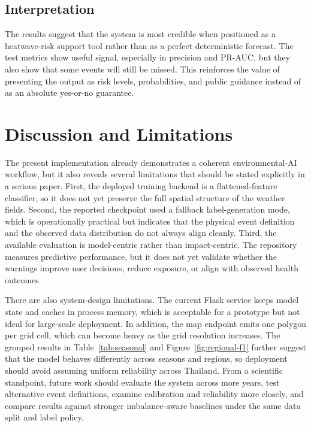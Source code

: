 \documentclass[12pt,a4paper]{article}
\begin{document}
\subsection{Interpretation}
The results suggest that the system is most credible when positioned as a heatwave-risk support tool rather than as a perfect deterministic forecast. The test metrics show useful signal, especially in precision and PR-AUC, but they also show that some events will still be missed. This reinforces the value of presenting the output as risk levels, probabilities, and public guidance instead of as an absolute yes-or-no guarantee.

\section{Discussion and Limitations}
The present implementation already demonstrates a coherent environmental-AI workflow, but it also reveals several limitations that should be stated explicitly in a serious paper. First, the deployed training backend is a flattened-feature classifier, so it does not yet preserve the full spatial structure of the weather fields. Second, the reported checkpoint used a fallback label-generation mode, which is operationally practical but indicates that the physical event definition and the observed data distribution do not always align cleanly. Third, the available evaluation is model-centric rather than impact-centric. The repository measures predictive performance, but it does not yet validate whether the warnings improve user decisions, reduce exposure, or align with observed health outcomes.

There are also system-design limitations. The current Flask service keeps model state and caches in process memory, which is acceptable for a prototype but not ideal for large-scale deployment. In addition, the map endpoint emits one polygon per grid cell, which can become heavy as the grid resolution increases. The grouped results in Table~\ref{tab:seasonal} and Figure~\ref{fig:regional-f1} further suggest that the model behaves differently across seasons and regions, so deployment should avoid assuming uniform reliability across Thailand. From a scientific standpoint, future work should evaluate the system across more years, test alternative event definitions, examine calibration and reliability more closely, and compare results against stronger imbalance-aware baselines under the same data split and label policy.
\end{document}
